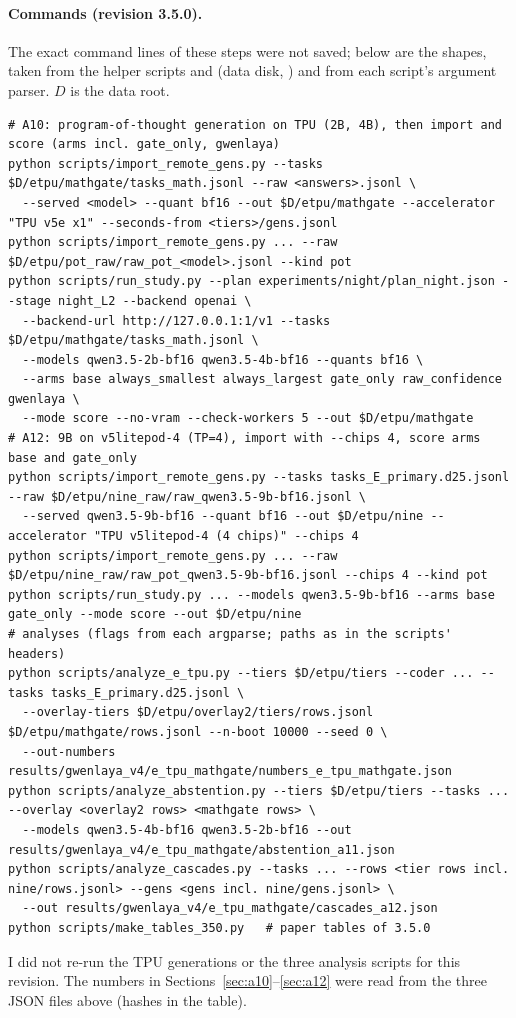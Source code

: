 \documentclass[11pt,a4paper]{article}
\newcommand{\code}[1]{\texttt{\detokenize{#1}}}
\begin{document}
\paragraph{Commands (revision 3.5.0).} The exact command lines of these steps were not saved; below are the shapes,
taken from the helper scripts \code{run_mathgate.sh} and \code{run_nine.sh} (data disk, \code{etpu/}) and from each
script's argument parser. $D$ is the data root.
{\scriptsize
\begin{verbatim}
# A10: program-of-thought generation on TPU (2B, 4B), then import and score (arms incl. gate_only, gwenlaya)
python scripts/import_remote_gens.py --tasks $D/etpu/mathgate/tasks_math.jsonl --raw <answers>.jsonl \
  --served <model> --quant bf16 --out $D/etpu/mathgate --accelerator "TPU v5e x1" --seconds-from <tiers>/gens.jsonl
python scripts/import_remote_gens.py ... --raw $D/etpu/pot_raw/raw_pot_<model>.jsonl --kind pot
python scripts/run_study.py --plan experiments/night/plan_night.json --stage night_L2 --backend openai \
  --backend-url http://127.0.0.1:1/v1 --tasks $D/etpu/mathgate/tasks_math.jsonl \
  --models qwen3.5-2b-bf16 qwen3.5-4b-bf16 --quants bf16 \
  --arms base always_smallest always_largest gate_only raw_confidence gwenlaya \
  --mode score --no-vram --check-workers 5 --out $D/etpu/mathgate
# A12: 9B on v5litepod-4 (TP=4), import with --chips 4, score arms base and gate_only
python scripts/import_remote_gens.py --tasks tasks_E_primary.d25.jsonl --raw $D/etpu/nine_raw/raw_qwen3.5-9b-bf16.jsonl \
  --served qwen3.5-9b-bf16 --quant bf16 --out $D/etpu/nine --accelerator "TPU v5litepod-4 (4 chips)" --chips 4
python scripts/import_remote_gens.py ... --raw $D/etpu/nine_raw/raw_pot_qwen3.5-9b-bf16.jsonl --chips 4 --kind pot
python scripts/run_study.py ... --models qwen3.5-9b-bf16 --arms base gate_only --mode score --out $D/etpu/nine
# analyses (flags from each argparse; paths as in the scripts' headers)
python scripts/analyze_e_tpu.py --tiers $D/etpu/tiers --coder ... --tasks tasks_E_primary.d25.jsonl \
  --overlay-tiers $D/etpu/overlay2/tiers/rows.jsonl $D/etpu/mathgate/rows.jsonl --n-boot 10000 --seed 0 \
  --out-numbers results/gwenlaya_v4/e_tpu_mathgate/numbers_e_tpu_mathgate.json
python scripts/analyze_abstention.py --tiers $D/etpu/tiers --tasks ... --overlay <overlay2 rows> <mathgate rows> \
  --models qwen3.5-4b-bf16 qwen3.5-2b-bf16 --out results/gwenlaya_v4/e_tpu_mathgate/abstention_a11.json
python scripts/analyze_cascades.py --tasks ... --rows <tier rows incl. nine/rows.jsonl> --gens <gens incl. nine/gens.jsonl> \
  --out results/gwenlaya_v4/e_tpu_mathgate/cascades_a12.json
python scripts/make_tables_350.py   # paper tables of 3.5.0
\end{verbatim}}
\noindent I did not re-run the TPU generations or the three analysis scripts for this revision. The numbers in
Sections~\ref{sec:a10}--\ref{sec:a12} were read from the three JSON files above (hashes in the table).
\end{document}
